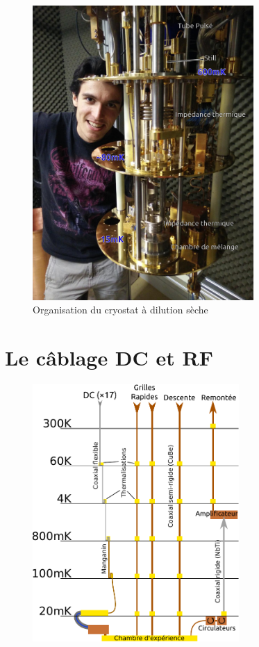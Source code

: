 \documentclass[a4paper,11pt]{report}
\begin{document}
\begin{figure}[h]
    \begin{center}
        \includegraphics[width=0.75\textwidth]{Images/PhotoCryostat}
        \caption{Organisation du cryostat à dilution sèche}
    \end{center}
\end{figure}


\chapter{Le câblage DC et RF}
\begin{figure}[h]
    \begin{center}
        \includegraphics[width=0.7\textwidth]{Images/Cablage_schema}
        \caption{}
        \label{fig:}
    \end{center}
\end{figure}
\end{document}
